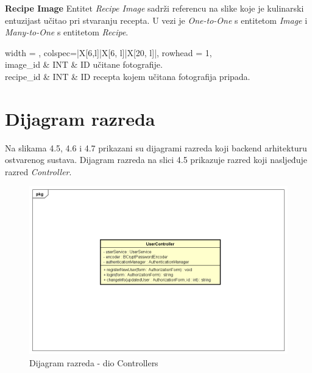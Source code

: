 				\textbf{Recipe Image} Entitet \textit{Recipe Image} sadrži referencu na slike koje je kulinarski entuzijast učitao pri stvaranju recepta. U vezi je \textit{One-to-One} s entitetom \textit{Image} i \textit{Many-to-One} s entitetom \textit{Recipe}.
				
				\begin{longtblr}[
					label=none,
					entry=none
					]{
						width = \textwidth,
						colspec={|X[6,l]|X[6, l]|X[20, l]|}, 
						rowhead = 1,
					} %
					\hline {}	 \\ \hline[3pt]
					image\_id & INT	&  ID učitane fotografije.  	\\ \hline
					recipe\_id & INT & ID recepta kojem učitana fotografija pripada. \\ \hline	
				\end{longtblr}
				
				\eject	
	
	  \section{Dijagram razreda}
	  
	  Na slikama 4.5, 4.6 i 4.7 prikazani su dijagrami razreda koji backend arhitekturu ostvarenog sustava. 
	  Dijagram razreda na slici 4.5 prikazuje razred koji nasljeđuje razred \textit{Controller}. 
	  
	  \begin{figure}[H]
			\includegraphics[scale=0.5]{dijagrami/UML_dijagram_razreda_controllers.png} %
			\centering
			\caption{Dijagram razreda - dio Controllers}
			\label{Dijagram razreda - dio Controllers}
		\end{figure}
			
